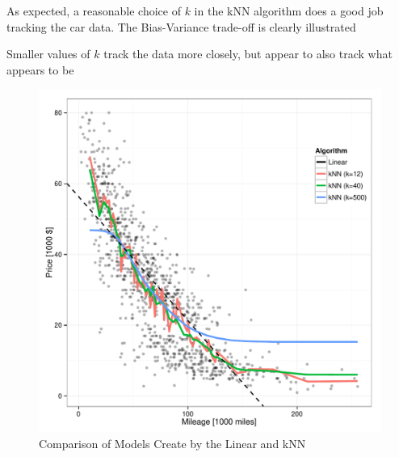 \documentclass[11pt, fleqn, titlepage]{article}
\begin{document}


As expected, a reasonable choice of $k$ in the kNN algorithm does a good job tracking the car data.  The Bias-Variance trade-off is clearly illustrated 

Smaller values of $k$ track the data more closely, but appear to also track what appears to be 


\begin{figure}[!htb]
  \centering
  \includegraphics[scale=.5]{pred_models.pdf}
  \caption{Comparison of Models Create by the Linear and kNN}
  \label{fig:models}
\end{figure}
\end{document}
